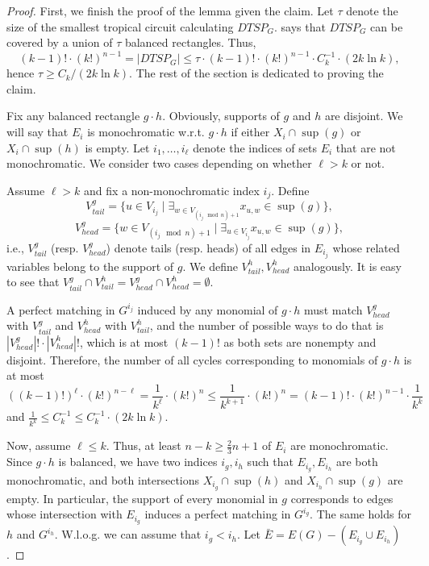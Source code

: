 \begin{proof}
    First, we finish the proof of the lemma given the claim. Let $\tau$ denote the size of the smallest tropical circuit calculating $DTSP_G$.  says that $DTSP_G$ can be covered by a union of $\tau$ balanced rectangles. Thus,
    $$
        (k - 1)! \cdot (k!)^{n - 1} = |DTSP_G| \leq \tau \cdot (k - 1)! \cdot (k!)^{n - 1} \cdot C_k^{-1} \cdot (2k \ln k),
    $$
    hence
    $
    \tau \geq C_k / (2k \ln k).
    $
    The rest of the section is dedicated to proving the claim.
    \newline

    Fix any balanced rectangle $g \cdot h$. Obviously, supports of $g$ and $h$ are disjoint. We will say that $E_i$ is monochromatic w.r.t. $g \cdot h$ if either $X_i \cap \sup(g)$ or $X_i \cap \sup(h)$ is empty. Let $i_1, \dots, i_\ell$ denote the indices of sets $E_i$ that are not monochromatic. We consider two cases depending on whether $\ell > k$ or not.

    Assume $\ell > k$ and fix a non-monochromatic index $i_j$. Define
    $$
    V^g_{tail} = \{ u \in V_{i_j} \mid \exists_{w \in V_{(i_j \mod n) + 1}} x_{u, w} \in \sup(g) \},
    $$
    $$
    V^g_{head} = \{ w \in V_{(i_j \mod n) + 1} \mid \exists_{u \in V_{i_j}} x_{u, w} \in \sup(g) \},
    $$
    i.e., $V^g_{tail}$ (resp. $V^g_{head}$) denote tails (resp. heads) of all edges in $E_{i_j}$ whose related variables belong to the support of $g$. We define $V^h_{tail}, V^h_{head}$ analogously. It is easy to see that $V^g_{tail} \cap V^h_{tail} = V^g_{head} \cap V^h_{head} = \emptyset$.

    A perfect matching in $G^{i_j}$ induced by any monomial of $g \cdot h$ must match $V^g_{head}$ with $V^g_{tail}$ and $V^h_{head}$ with $V^h_{tail}$, and the number of possible ways to do that is
    $
    |V^g_{head}|! \cdot |V^h_{head}|!
    $, which is at most $(k - 1)!$ as both sets are nonempty and disjoint. Therefore, the number of all cycles corresponding to monomials of $g \cdot h$ is at most
    $$
    ((k - 1)!)^\ell \cdot (k!)^{n - \ell} = \frac{1}{k^\ell} \cdot (k!)^n \leq
    \frac{1}{k^{k + 1}} \cdot (k!)^n = (k - 1)! \cdot (k!)^{n - 1} \cdot \frac{1}{k^k}
    $$
    and $\frac{1}{k^k} \leq C_k^{-1} \leq C_k^{-1} \cdot (2k \ln k)$.
    \newline
    
    Now, assume $\ell \leq k$. Thus, at least $n - k \geq \frac{2}{3}n + 1$ of $E_i$ are monochromatic. Since $g \cdot h$ is balanced, we have two indices $i_g, i_h$ such that $E_{i_g}, E_{i_h}$ are both monochromatic, and both intersections $X_{i_g} \cap \sup(h)$ and $X_{i_h} \cap \sup(g)$ are empty. In particular, the support of every monomial in $g$ corresponds to edges whose intersection with $E_{i_g}$ induces a perfect matching in $G^{i_g}$. The same holds for $h$ and $G^{i_h}$. W.l.o.g. we can assume that $i_g < i_h$. Let $\bar{E} = E(G) - (E_{i_g} \cup E_{i_h})$.


\end{proof}
